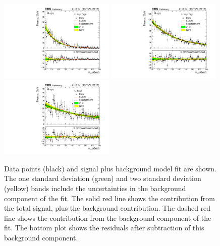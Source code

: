 \begin{figure}[hptb]
  \centering
  \includegraphics[width=0.49\textwidth]{Figures/Appendices/_forAppendix2017ch2_RECO_1J_PTH_120_200_Tag0_13TeV.pdf}
  \includegraphics[width=0.49\textwidth]{Figures/Appendices/_forAppendix2017ch2_RECO_1J_PTH_120_200_Tag1_13TeV.pdf}
  \includegraphics[width=0.49\textwidth]{Figures/Appendices/_forAppendix2017ch2_RECO_1J_PTH_GT200_13TeV.pdf}
  \caption[Signal plus background fits to data.]
  {
    Data points (black) and signal plus background model fit are shown. 
    The one standard deviation (green) and two standard deviation (yellow) bands 
    include the uncertainties in the background component of the fit. 
    The solid red line shows the contribution from the total signal, plus the background contribution. 
    The dashed red line shows the contribution from the background component of the fit. 
    The bottom plot shows the residuals after subtraction of this background component.
  }
\end{figure}

